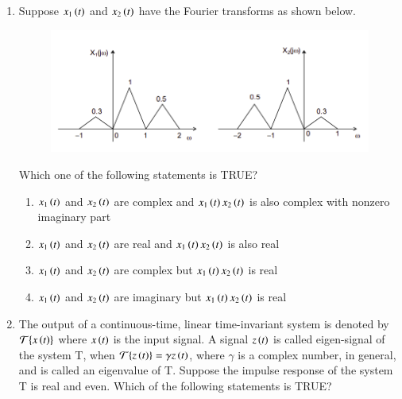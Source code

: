 \documentclass[journal,12pt,onecolumn]{IEEEtran}
\theoremstyle{remark}
\begin{document}
\begin{enumerate}[start=1, label=Q.\arabic*]
    \item Suppose $x_1\left(t\right)$ and $x_2\left(t\right)$ have the Fourier transforms as shown below.
    \begin{figure}[H]
        \includegraphics[width=0.8\columnwidth]{Figures/q34.png}
        \centering
        \caption{}
    \end{figure}
    Which one of the following statements is TRUE?
    \begin{enumerate}
        \item $x_1\left(t\right)$ and $x_2\left(t\right)$ are complex and $x_1\left(t\right)x_2\left(t\right)$ is also complex with nonzero imaginary part
        \item $x_1\left(t\right)$ and $x_2\left(t\right)$ are real and $x_1\left(t\right)x_2\left(t\right)$ is also real
        \item $x_1\left(t\right)$ and $x_2\left(t\right)$ are complex but $x_1\left(t\right)x_2\left(t\right)$ is real
        \item $x_1\left(t\right)$ and $x_2\left(t\right)$ are imaginary but $x_1\left(t\right)x_2\left(t\right)$ is real
    \end{enumerate}

    \hfill{}

    \item The output of a continuous-time, linear time-invariant system is denoted by $\mathcal{T}\{x\left(t\right)\}$ where $x\left(t\right)$ is the input signal. A signal $z\left(t\right)$ is called eigen-signal of the system T, when $\mathcal{T}\{z\left(t\right)\} = \gamma z\left(t\right)$, where $\gamma$ is a complex number, in general, and is called an eigenvalue of T. Suppose the impulse response of the system T is real and even. Which of the following statements is TRUE?
    \begin{enumerate}
    \end{enumerate}


\end{enumerate}
\end{document}
